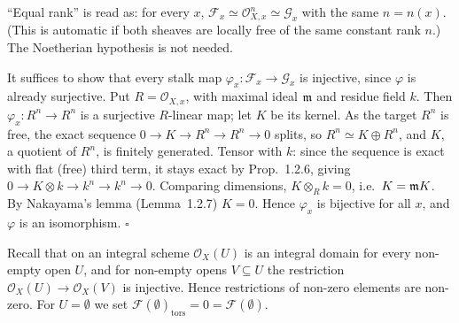 \documentclass[11pt]{article}
\begin{document}
\pf
``Equal rank'' is read as: for every $x$, $\mathcal F_x\simeq\mathcal O_{X,x}^n\simeq\mathcal G_x$ with the same $n=n(x)$. (This is automatic if both sheaves are locally free of the same constant rank $n$.) The Noetherian hypothesis is not needed.

It suffices to show that every stalk map $\varphi_x:\mathcal F_x\to\mathcal G_x$ is injective, since $\varphi$ is already surjective. Put $R=\mathcal O_{X,x}$, with maximal ideal $\mathfrak m$ and residue field $k$. Then $\varphi_x:R^n\to R^n$ is a surjective $R$-linear map; let $K$ be its kernel. As the target $R^n$ is free, the exact sequence $0\to K\to R^n\to R^n\to0$ splits, so $R^n\simeq K\oplus R^n$, and $K$, a quotient of $R^n$, is finitely generated. Tensor with $k$: since the sequence is exact with flat (free) third term, it stays exact by Prop.~1.2.6, giving $0\to K\otimes k\to k^n\to k^n\to0$. Comparing dimensions, $K\otimes_Rk=0$, i.e.\ $K=\mathfrak m K$. By Nakayama's lemma (Lemma~1.2.7) $K=0$. Hence $\varphi_x$ is bijective for all $x$, and $\varphi$ is an isomorphism. \hfill$\square$

\pf
Recall that on an integral scheme $\mathcal O_X(U)$ is an integral domain for every non-empty open $U$, and for non-empty opens $V\subseteq U$ the restriction $\mathcal O_X(U)\to\mathcal O_X(V)$ is injective. Hence restrictions of non-zero elements are non-zero. For $U=\emptyset$ we set $\mathcal F(\emptyset)_{\operatorname{tors}}=0=\mathcal F(\emptyset)$.
\end{document}
